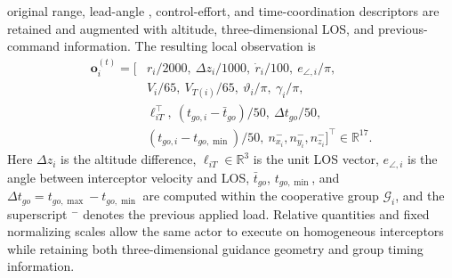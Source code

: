 \documentclass[lettersize,journal]{IEEEtran}
\providecommand{\DIFadd}[1]{{\protect\color{blue} #1}} %
\providecommand{\DIFdel}[1]{} %
\providecommand{\DIFaddbegin}{} %
\providecommand{\DIFaddend}{} %
\providecommand{\DIFdelbegin}{} %
\providecommand{\DIFdelend}{} %
\begin{document}
\DIFdel{where $\Delta\dot{q}_{\max} = 0.03$~rad/s is the LOS-rate noise threshold,
$\mathcal{G}_i$ denotes the set of interceptors assigned to the same target as interceptor $i$, and $\Delta t$ is the simulation timestep. Component $o_i^{(t),1}$ is
a smoothed required normal acceleration proportional to $V_i \dot{q}_i^{(t)} / g$, where the previous LOS-rate estimate is retained when the instantaneous measurement jump exceeds $\Delta \dot{q}_{\max}$.
Component $o_i^{(t),2}$ is the }\DIFdelend \DIFaddbegin \DIFadd{original range, }\DIFaddend lead-angle\DIFdelbegin \DIFdel{deviation driving heading correction,
where $q_i$ (and its derivative $\dot{q}_i$) denotes the specific line-of-sight (LOS) }\DIFdelend \DIFaddbegin \DIFadd{, control-effort,
and time-coordination descriptors are retained and augmented with altitude,
three-dimensional LOS, and previous-command information. The resulting local
observation is
}\begin{equation}
\label{eq:observation_space}
\begin{split}
\mathbf{o}_i^{(t)}=[&
r_i/2000,\ \Delta z_i/1000,\ \dot r_i/100,\ e_{\angle,i}/\pi,\\
&V_i/65,\ V_{T(i)}/65,\ \vartheta_i/\pi,\ \gamma_i/\pi,\\
&\boldsymbol{\ell}_{iT}^{\top},\
(t_{go,i}-\bar t_{go})/50,\ \Delta t_{go}/50,\\
&(t_{go,i}-t_{go,\min})/50,\
n_{x_i}^{-},n_{y_i}^{-},n_{z_i}^{-}]^\top
\in\mathbb R^{17}.
\end{split}
\end{equation}
\DIFadd{Here \(\Delta z_i\) is the altitude difference,
\(\boldsymbol{\ell}_{iT}\in\mathbb R^3\) is the unit LOS vector,
\(e_{\angle,i}\) is the }\DIFaddend angle between interceptor \DIFdelbegin \DIFdel{$i$ and its dynamically assigned target. 
Component $o_i^{(t),3}$ encodes the
instantaneous control energy expenditure. Component $o_i^{(t),4}$ is the velocity error relative to the desired approach speed $r_i / \min_j t_{go_j}$, which drives time-coordinated impact}\DIFdelend \DIFaddbegin \DIFadd{velocity and LOS,
\(\bar t_{go}\), \(t_{go,\min}\), and
\(\Delta t_{go}=t_{go,\max}-t_{go,\min}\) are computed within the
cooperative group \(\mathcal G_i\), and the superscript \({}^{-}\) denotes the
previous applied load. Relative quantities and fixed normalizing scales allow
the same actor to execute on homogeneous interceptors while retaining both
three-dimensional guidance geometry and group timing information}\DIFaddend .
\end{document}

